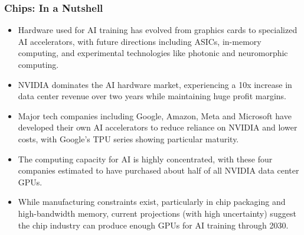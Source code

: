 \documentclass[aspectratio=169]{beamer}
\begin{document}
    \begin{frame}
        \frametitle{Chips: In a Nutshell}
        \begin{itemize}
            \item Hardware used for AI training has evolved from graphics cards to specialized AI accelerators, with future directions including ASICs, in-memory computing, and experimental technologies like photonic and neuromorphic computing.
            \item NVIDIA dominates the AI hardware market, experiencing a 10x increase in data center revenue over two years while maintaining huge profit margins.
            \item Major tech companies including Google, Amazon, Meta and Microsoft have developed their own AI accelerators to reduce reliance on NVIDIA and lower costs, with Google's TPU series showing particular maturity.
            \item The computing capacity for AI is highly concentrated, with these four companies estimated to have purchased about half of all NVIDIA data center GPUs.
            \item While manufacturing constraints exist, particularly in chip packaging and high-bandwidth memory, current projections (with high uncertainty) suggest the chip industry can produce enough GPUs for AI training through 2030.
        \end{itemize}
    \end{frame}
\end{document}
